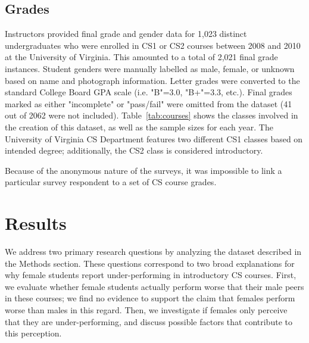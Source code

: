 \documentclass[a4paper,man,natbib]{apa6}
\begin{document}
\subsection{Grades}
\label{sec:grade}
Instructors provided final grade and gender data for 1,023 distinct
undergraduates who were enrolled in CS1 or CS2 courses between 2008 and 2010 at
the University of Virginia. This amounted to a total of 2,021 final grade
instances. Student genders were manually labelled as male, female, or unknown
based on name and photograph information. Letter grades were converted to the
standard College Board GPA scale (i.e. "B"=3.0, "B+"=3.3, etc.). Final grades
marked as either "incomplete" or "pass/fail" were omitted from the dataset (41
out of 2062 were not included). Table~\ref{tab:courses} shows the classes involved in
the creation of this dataset, as well as the sample sizes for each year. The
University of Virginia CS Department features two different CS1 classes based
on intended degree; additionally, the CS2 class is considered introductory. 

Because of the anonymous nature of the surveys, it was impossible to link a
particular survey respondent to a set of CS course grades.

\section{Results}
\label{sec:results}
We address two primary research questions by analyzing the dataset described in
the Methods section. These questions correspond to two broad explanations for
why female students report under-performing in introductory CS courses. First,
we evaluate whether female students actually perform worse that their male peers
in these courses; we find no evidence to support the claim that females perform
worse than males in this regard. Then, we investigate if females only perceive
that they are under-performing, and discuss possible factors that contribute to
this perception. 
\end{document}
